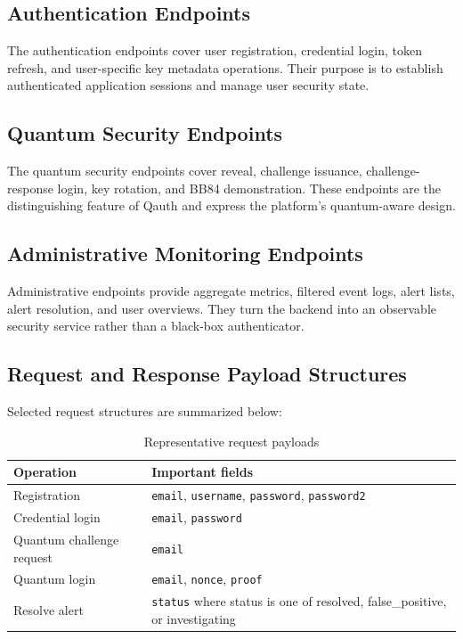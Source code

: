 \documentclass[12pt,a4paper]{report}
\begin{document}
\subsection{Authentication Endpoints}
The authentication endpoints cover user registration, credential login, token refresh, and user-specific key metadata operations. Their purpose is to establish authenticated application sessions and manage user security state.

\subsection{Quantum Security Endpoints}
The quantum security endpoints cover reveal, challenge issuance, challenge-response login, key rotation, and BB84 demonstration. These endpoints are the distinguishing feature of Qauth and express the platform's quantum-aware design.

\subsection{Administrative Monitoring Endpoints}
Administrative endpoints provide aggregate metrics, filtered event logs, alert lists, alert resolution, and user overviews. They turn the backend into an observable security service rather than a black-box authenticator.

\subsection{Request and Response Payload Structures}
Selected request structures are summarized below:

\begin{table}[H]
\centering
\small
\caption{Representative request payloads}
\label{tab:payloads}
\begin{tabular}{|p{3.6cm}|p{8.8cm}|}
\hline
\textbf{Operation} & \textbf{Important fields} \\
\hline
Registration & \texttt{email}, \texttt{username}, \texttt{password}, \texttt{password2} \\
\hline
Credential login & \texttt{email}, \texttt{password} \\
\hline
Quantum challenge request & \texttt{email} \\
\hline
Quantum login & \texttt{email}, \texttt{nonce}, \texttt{proof} \\
\hline
Resolve alert & \texttt{status} where status is one of resolved, false\_positive, or investigating \\
\hline
\end{tabular}
\end{table}
\end{document}
